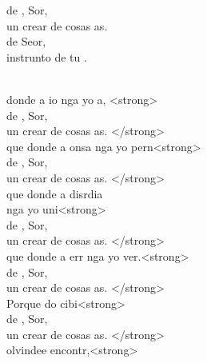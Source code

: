 \documentclass[12pt]{article}
\begin{document}
\begin{multicols*}{2}
\begin{cancion}%
	\begin{chorus}%
	 de , Sor,  \\
	un crear de cosas as. \\
	 de  Seor,\\
	instrunto de tu .  \\
	\end{chorus}%
	\jump\\
	 donde a io nga yo a, <strong>\\
	 de , Sor,  \\
	un crear de cosas as. </strong>\\
	que donde a onsa nga yo pern<strong>\\
	 de , Sor,  \\
	un crear de cosas as. </strong>\\
	que donde a disrdia \\
	nga yo uni<strong>\\
	 de , Sor,  \\
	un crear de cosas as. </strong>\\
	que donde a err nga yo ver.<strong>\\
	 de , Sor,  \\
	un crear de cosas as. </strong>\\
	Porque do  cibi<strong>\\
	 de , Sor,  \\
	un crear de cosas as. </strong>\\
	olvindee encontr,<strong> \\

\end{cancion}
\end{multicols*}
\end{document}
